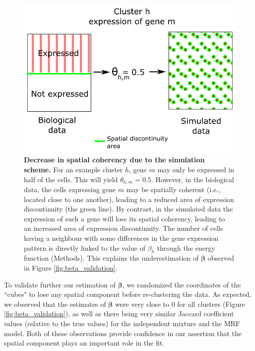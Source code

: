 	\begin{figure}[h]
\centerline{\includegraphics[width=\linewidth]{gfx/chapter5/beta_error.png}}
\caption{{\bf Decrease in spatial coherency due to the simulation scheme.} For an example cluster $h$, gene $m$ may only be expressed in half of the cells. This will yield $\theta_{h,m} = 0.5$. However, in the biological data, the cells expressing gene $m$ may be spatially coherent (i.e., located close to one another), leading to a reduced area of expression discontinuity (the green line). By contrast, in the simulated data the expression of such a gene will lose its spatial coherency, leading to an increased area of expression discontinuity. The number of cells having a neighbour with some differences in the gene expression pattern is directly linked to the value of $\beta_h$ through the energy function (Methods). This explains the underestimation of $\mathbf{\beta}$ observed in Figure \ref{fig:beta_validation}.}
\label{fig:beta_error}
	\end{figure}

To validate further our estimation of $\mathbf{\beta}$, we randomized the coordinates of the ``cubes" to lose any spatial component before re-clustering the data. As expected, we observed that the estimates of $\mathbf{\beta}$ were very close to $0$ for all clusters (Figure \ref{fig:beta_validation}),  as well as there being very similar Jaccard coefficient values (relative to the true values) for the independent mixture and the MRF model. Both of these observations provide confidence in our assertion that the spatial component plays an important role in the fit.\\
